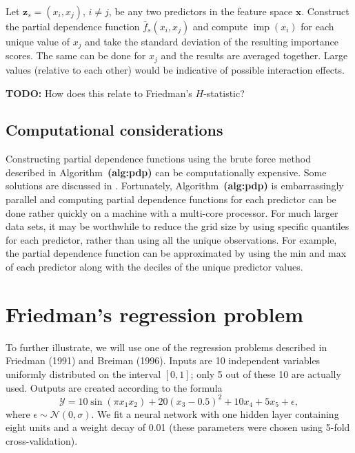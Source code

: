 \documentclass[12pt]{article}
\def\ref#1{\textbf{(#1)}}
\DeclareMathOperator{\imp}{imp}
\begin{document}
Let $\boldsymbol{z}_s = \left(x_i, x_j\right)$, $i \neq j$, be any two predictors in the feature space $\boldsymbol{x}$. Construct the partial dependence function $\bar{f}_s\left(x_i, x_j\right)$ and compute $\imp\left(x_i\right)$ for each unique value of $x_j$ and take the standard deviation of the resulting importance scores. The same can be done for $x_j$ and the results are averaged together. Large values (relative to each other) would be indicative of possible interaction effects. 

\textbf{TODO:} How does this relate to Friedman's $H$-statistic?


\subsection{Computational considerations}

Constructing partial dependence functions using the brute force method described in Algorithm~\ref{alg:pdp} can be computationally expensive. Some solutions are discussed in \citet{pdp-greenwell-2017}. Fortunately, Algorithm~\ref{alg:pdp} is embarrassingly parallel and computing partial dependence functions for each predictor can be done rather quickly on a machine with a multi-core processor. For much larger data sets, it may be worthwhile to reduce the grid size by using specific quantiles for each predictor, rather than using all the unique observations. For example, the partial dependence function can be approximated by using the min and max of each predictor along with the deciles of the unique predictor values.


\section{Friedman's regression problem}

To further illustrate, we will use one of the regression problems described in Friedman (1991) and Breiman (1996). Inputs are 10 independent variables uniformly distributed on the interval $\left[0, 1\right]$; only 5 out of these 10 are actually used. Outputs are created according to the formula
\begin{equation}
\mathcal{Y} = 10 \sin\left(\pi x_1 x_2\right) + 20 \left(x_3 - 0.5\right) ^ 2 + 10 x_4 + 5 x_5 + \epsilon,
\end{equation}
where $\epsilon \sim \mathcal{N}\left(0, \sigma\right)$. We fit a neural network with one hidden layer containing eight units and a weight decay of 0.01 (these parameters were chosen using 5-fold cross-validation). %
\end{document}
